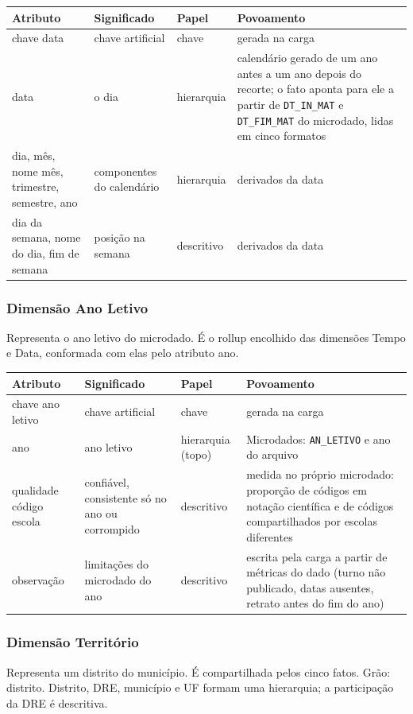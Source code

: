 \documentclass[11pt,a4paper]{article}
\newcommand{\cod}[1]{\texttt{#1}}
\newenvironment{atributos}{%
  \small
  \begin{longtable}{>{\raggedright}p{2.6cm}>{\raggedright}p{4.6cm}>{\raggedright}p{1.9cm}>{\raggedright\arraybackslash}p{5.3cm}}
  \toprule \textbf{Atributo} & \textbf{Significado} & \textbf{Papel} & \textbf{Povoamento}\\ \midrule \endhead
  \bottomrule \endlastfoot
}{\end{longtable}\addtocounter{table}{-1}}
\begin{document}
\begin{atributos}
chave data & chave artificial & chave & gerada na carga \\
data & o dia & hierarquia & calendário gerado de um ano antes a um ano depois do recorte; o fato aponta para ele a partir de \cod{DT_IN_MAT} e \cod{DT_FIM_MAT} do microdado, lidas em cinco formatos \\
dia, mês, nome mês, trimestre, semestre, ano & componentes do calendário & hierarquia & derivados da data \\
dia da semana, nome do dia, fim de semana & posição na semana & descritivo & derivados da data \\
\end{atributos}

\subsubsection{Dimensão Ano Letivo}
Representa o ano letivo do microdado. É o rollup encolhido das dimensões Tempo e Data, conformada com elas pelo atributo ano.

\begin{atributos}
chave ano letivo & chave artificial & chave & gerada na carga \\
ano & ano letivo & hierarquia (topo) & Microdados: \cod{AN_LETIVO} e ano do arquivo \\
qualidade código escola & confiável, consistente só no ano ou corrompido & descritivo & medida no próprio microdado: proporção de códigos em notação científica e de códigos compartilhados por escolas diferentes \\
observação & limitações do microdado do ano & descritivo & escrita pela carga a partir de métricas do dado (turno não publicado, datas ausentes, retrato antes do fim do ano) \\
\end{atributos}

\subsubsection{Dimensão Território}
Representa um distrito do município. É compartilhada pelos cinco fatos. Grão: distrito. Distrito, DRE, município e UF formam uma hierarquia; a participação da DRE é descritiva.
\end{document}
